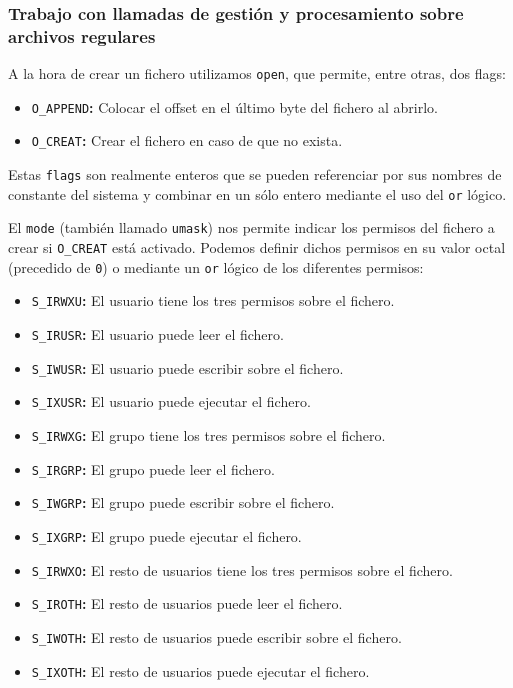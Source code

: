 \subsubsection{Trabajo con llamadas de gestión y procesamiento sobre archivos regulares}

A la hora de crear un fichero utilizamos \texttt{open}, que permite, entre otras, dos flags:

\begin{itemize}
	\item\texttt{O\_APPEND}\textbf{:} Colocar el offset en el último byte del fichero al abrirlo.
	\item\texttt{O\_CREAT}\textbf{:} Crear el fichero en caso de que no exista.
\end{itemize}

Estas \texttt{flags} son realmente enteros que se pueden referenciar por sus nombres de constante del sistema y combinar en un sólo entero mediante el uso del \texttt{or} lógico.

El \texttt{mode} (también llamado \texttt{umask}) nos permite indicar los permisos del fichero a crear si \texttt{O\_CREAT} está activado.
Podemos definir dichos permisos en su valor octal (precedido de \texttt{0}) o mediante un \texttt{or} lógico de los diferentes permisos:

\begin{itemize}
	\item\texttt{S\_IRWXU}\textbf{:} El usuario tiene los tres permisos sobre el fichero.
	\item\texttt{S\_IRUSR}\textbf{:} El usuario puede leer el fichero.
	\item\texttt{S\_IWUSR}\textbf{:} El usuario puede escribir sobre el fichero.
	\item\texttt{S\_IXUSR}\textbf{:} El usuario puede ejecutar el fichero.
	\item\texttt{S\_IRWXG}\textbf{:} El grupo tiene los tres permisos sobre el fichero.
	\item\texttt{S\_IRGRP}\textbf{:} El grupo puede leer el fichero.
	\item\texttt{S\_IWGRP}\textbf{:} El grupo puede escribir sobre el fichero.
	\item\texttt{S\_IXGRP}\textbf{:} El grupo puede ejecutar el fichero.
	\item\texttt{S\_IRWXO}\textbf{:} El resto de usuarios tiene los tres permisos sobre el fichero.
	\item\texttt{S\_IROTH}\textbf{:} El resto de usuarios puede leer el fichero.
	\item\texttt{S\_IWOTH}\textbf{:} El resto de usuarios puede escribir sobre el fichero.
	\item\texttt{S\_IXOTH}\textbf{:} El resto de usuarios puede ejecutar el fichero.
\end{itemize}

